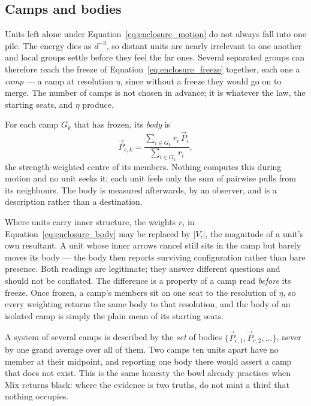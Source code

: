 \documentclass[12pt, a4paper]{article}
\begin{document}
\subsection{Camps and bodies}
\label{subsec:enclosure_camps}
Units left alone under Equation~\eqref{eq:enclosure_motion} do not
always fall into one pile. The energy dies as $d^{-3}$, so distant
units are nearly irrelevant to one another and local groups settle
before they feel the far ones. Several separated groups can
therefore reach the freeze of Equation~\eqref{eq:enclosure_freeze}
together, each one a \emph{camp} --- a camp at resolution $\eta$,
since without a freeze they would go on to merge. The number of
camps is not chosen in advance; it is whatever the law, the starting
seats, and $\eta$ produce.

For each camp $G_k$ that has frozen, its \emph{body} is
\begin{equation}
    \vec P_{c,k}
    = \frac{\sum_{i\in G_k} r_i\,\vec P_i}{\sum_{i\in G_k} r_i},
    \label{eq:enclosure_body}
\end{equation}
the strength-weighted centre of its members. Nothing computes this
during motion and no unit seeks it; each unit feels only the sum of
pairwise pulls from its neighbours. The body is measured afterwards,
by an observer, and is a description rather than a destination.

Where units carry inner structure, the weights $r_i$ in
Equation~\eqref{eq:enclosure_body} may be replaced by
$\lvert V_i\rvert$, the magnitude of a unit's own resultant. A unit
whose inner arrows cancel still sits in the camp but barely moves its
body --- the body then reports surviving configuration rather than
bare presence. Both readings are legitimate; they answer different
questions and should not be conflated. The difference is a property
of a camp read \emph{before} its freeze. Once frozen, a camp's
members sit on one seat to the resolution of $\eta$, so every
weighting returns the same body to that resolution, and the body of
an isolated camp is simply the plain mean of its starting seats.

A system of several camps is described by the \emph{set} of bodies
$\{\vec P_{c,1},\vec P_{c,2},\ldots\}$, never by one grand average
over all of them. Two camps ten units apart have no member at their
midpoint, and reporting one body there would assert a camp that does
not exist. This is the same honesty the bowl already practises when
Mix returns black: where the evidence is two truths, do not mint a
third that nothing occupies.
\end{document}

